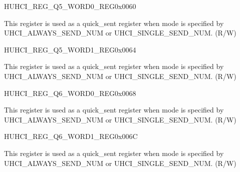 \begin{register}{H}{UHCI\_REG\_Q5\_WORD0\_REG}{0x{}0060}\label{regdesc:UHCIREGQ5WORD0REG}
%
\regnewline%
\begin{regdesc}\begin{reglist}
\label{fielddesc:UHCISENDQ5WORD0}\item [UHCI\_SEND\_Q5\_WORD0] This register is used as a quick\_sent register when mode is specified by UHCI\_ALWAYS\_SEND\_NUM or UHCI\_SINGLE\_SEND\_NUM. (R/W)
\end{reglist}\end{regdesc}
\end{register}


\begin{register}{H}{UHCI\_REG\_Q5\_WORD1\_REG}{0x{}0064}\label{regdesc:UHCIREGQ5WORD1REG}
%
\regnewline%
\begin{regdesc}\begin{reglist}
\label{fielddesc:UHCISENDQ5WORD1}\item [UHCI\_SEND\_Q5\_WORD1] This register is used as a quick\_sent register when mode is specified by UHCI\_ALWAYS\_SEND\_NUM or UHCI\_SINGLE\_SEND\_NUM. (R/W)
\end{reglist}\end{regdesc}
\end{register}


\begin{register}{H}{UHCI\_REG\_Q6\_WORD0\_REG}{0x{}0068}\label{regdesc:UHCIREGQ6WORD0REG}
%
\regnewline%
\begin{regdesc}\begin{reglist}
\label{fielddesc:UHCISENDQ6WORD0}\item [UHCI\_SEND\_Q6\_WORD0] This register is used as a quick\_sent register when mode is specified by UHCI\_ALWAYS\_SEND\_NUM or UHCI\_SINGLE\_SEND\_NUM. (R/W)
\end{reglist}\end{regdesc}
\end{register}


\begin{register}{H}{UHCI\_REG\_Q6\_WORD1\_REG}{0x{}006C}\label{regdesc:UHCIREGQ6WORD1REG}
%
\regnewline%
\begin{regdesc}\begin{reglist}
\label{fielddesc:UHCISENDQ6WORD1}\item [UHCI\_SEND\_Q6\_WORD1] This register is used as a quick\_sent register when mode is specified by UHCI\_ALWAYS\_SEND\_NUM or UHCI\_SINGLE\_SEND\_NUM. (R/W)
\end{reglist}\end{regdesc}
\end{register}


